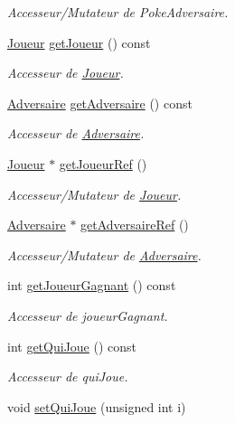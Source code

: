\begin{DoxyCompactItemize}
\begin{DoxyCompactList}\small\item\em Accesseur/\+Mutateur de Poke\+Adversaire. \end{DoxyCompactList}\item 
\hyperlink{class_joueur}{Joueur} \hyperlink{class_combat_a3784ddbca993b5ad0fb0d4dd382f919a}{get\+Joueur} () const
\begin{DoxyCompactList}\small\item\em Accesseur de \hyperlink{class_joueur}{Joueur}. \end{DoxyCompactList}\item 
\hyperlink{class_adversaire}{Adversaire} \hyperlink{class_combat_a018644148fc62da9c8abfafc166713c4}{get\+Adversaire} () const
\begin{DoxyCompactList}\small\item\em Accesseur de \hyperlink{class_adversaire}{Adversaire}. \end{DoxyCompactList}\item 
\hyperlink{class_joueur}{Joueur} $\ast$ \hyperlink{class_combat_af72bd31264a8cdeeb3f3f8c30c727d33}{get\+Joueur\+Ref} ()
\begin{DoxyCompactList}\small\item\em Accesseur/\+Mutateur de \hyperlink{class_joueur}{Joueur}. \end{DoxyCompactList}\item 
\hyperlink{class_adversaire}{Adversaire} $\ast$ \hyperlink{class_combat_a59088f5725884e9c363ad72a946c82ef}{get\+Adversaire\+Ref} ()
\begin{DoxyCompactList}\small\item\em Accesseur/\+Mutateur de \hyperlink{class_adversaire}{Adversaire}. \end{DoxyCompactList}\item 
int \hyperlink{class_combat_a7faa6a3b11778224b04524db1418d67f}{get\+Joueur\+Gagnant} () const
\begin{DoxyCompactList}\small\item\em Accesseur de joueur\+Gagnant. \end{DoxyCompactList}\item 
int \hyperlink{class_combat_aed2119127fb9b7ed023dd481927c27aa}{get\+Qui\+Joue} () const
\begin{DoxyCompactList}\small\item\em Accesseur de qui\+Joue. \end{DoxyCompactList}\item 
void \hyperlink{class_combat_a292caf86cb2c8ecbf9ecd055e6a028c0}{set\+Qui\+Joue} (unsigned int i)

\end{DoxyCompactItemize}
